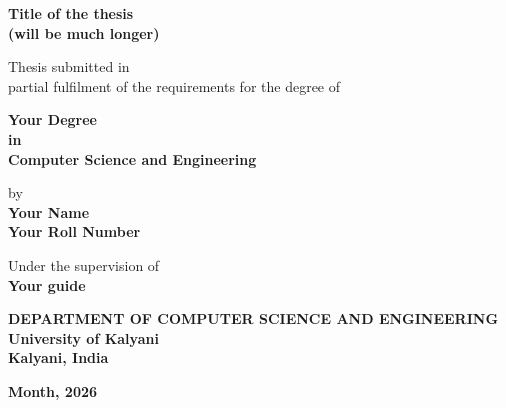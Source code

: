 \documentclass[12pt,a4paper,twoside,openright]{report}
\begin{document}
\begin{titlepage}
    \centering
    {\Huge\bfseries Title of the thesis \\[0.3em] (will be much longer) \par}
    
    \vspace{3cm}
    {\large Thesis submitted in \\ partial fulfilment of the requirements for the degree of \par}
    
    \vspace{1.5cm}
    {\Large\bfseries Your Degree \\ \large in \\ \Large\bfseries Computer Science and Engineering \par}
    
    \vspace{2cm}
    {\large by \\ \bfseries Your Name \\ Your Roll Number \par}
    
    \vspace{1.5cm}
    {\large Under the supervision of \\ \bfseries Your guide \par}
    
    \vfill
    {\large \bfseries \MakeUppercase{Department of Computer Science and Engineering} \\ University of Kalyani \\ Kalyani, India \par}
    
    \vspace{1cm}
    {\large\bfseries Month, 2026 \par}
\end{titlepage}

\cleardoublepage %



\end{document}
